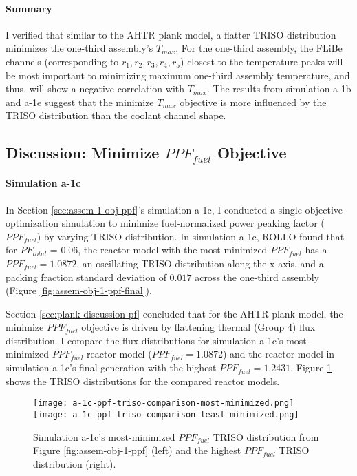 \paragraph{Summary}
I verified that similar to the \gls{AHTR} plank model, a flatter TRISO distribution 
minimizes the one-third assembly's $T_{max}$. 
For the one-third assembly, the FLiBe channels (corresponding to $r_1, r_2, r_3, r_4, 
r_5$) closest to the temperature peaks will be most important to minimizing maximum
one-third assembly temperature, and thus, will show a negative correlation with 
$T_{max}$. 
The results from simulation a-1b and a-1e suggest that the minimize $T_{max}$ objective 
is more influenced by the TRISO distribution than the coolant channel shape. 

\subsection{Discussion: Minimize $PPF_{fuel}$ Objective}
\label{sec:assem-discussion-ppf}
\paragraph{Simulation a-1c}
In Section \ref{sec:assem-1-obj-ppf}'s simulation a-1c, I conducted a single-objective 
optimization simulation to minimize fuel-normalized power peaking factor ($PPF_{fuel}$) 
by varying TRISO distribution. 
In simulation a-1c, \gls{ROLLO} found that for $PF_{total}$ = 0.06, the reactor model 
with the most-minimized $PPF_{fuel}$ has a $PPF_{fuel} = 1.0872$, an oscillating 
TRISO distribution along the x-axis, and a packing fraction standard deviation of 
$0.017$ across the one-third assembly (Figure \ref{fig:assem-obj-1-ppf-final}). 

Section \ref{sec:plank-discussion-pf} concluded that for the \gls{AHTR} plank 
model, the minimize $PPF_{fuel}$ objective is driven by flattening thermal 
(Group 4) flux distribution. 
I compare the flux distributions for simulation a-1c's most-minimized $PPF_{fuel}$ 
reactor model ($PPF_{fuel} = 1.0872$) and the reactor model in simulation a-1c's 
final generation with the highest $PPF_{fuel} = 1.2431$. 
Figure \ref{fig:a-1c-ppf-triso-comparison} shows the TRISO distributions for the 
compared reactor models. 
\begin{figure}[htbp!]
    \centering
    \texttt{[image: a-1c-ppf-triso-comparison-most-minimized.png]} 
    \texttt{[image: a-1c-ppf-triso-comparison-least-minimized.png]} 
    \caption{Simulation a-1c's most-minimized $PPF_{fuel}$ TRISO distribution 
    from Figure \ref{fig:assem-obj-1-ppf} (left) and the highest $PPF_{fuel}$ TRISO 
    distribution (right).}
    \label{fig:a-1c-ppf-triso-comparison}
\end{figure}

